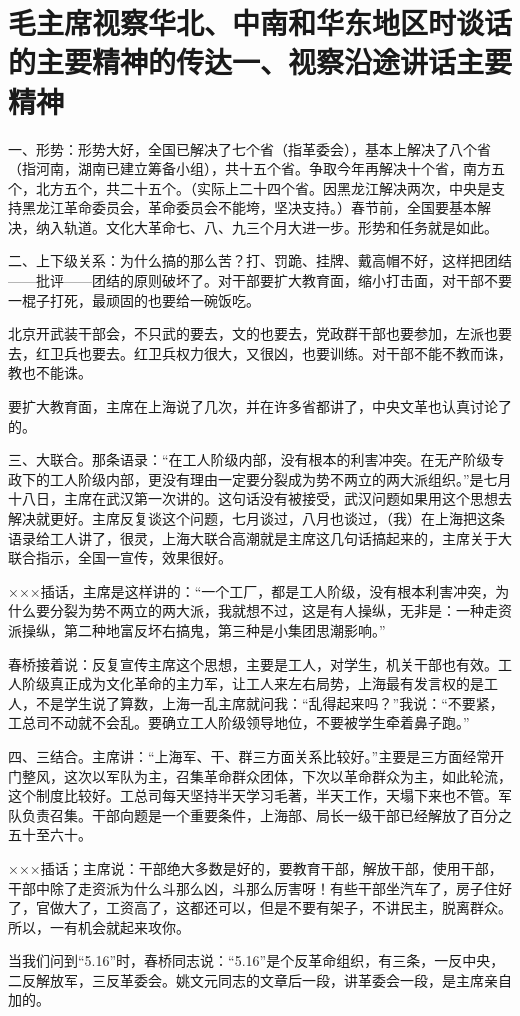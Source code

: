 \section[毛主席视察华北、中南和华东地区时谈话的主要精神的传达一、视察沿途讲话主要精神]{毛主席视察华北、中南和华东地区时谈话的主要精神的传达一、视察沿途讲话主要精神}


一、形势：形势大好，全国已解决了七个省（指革委会），基本上解决了八个省（指河南，湖南已建立筹备小组），共十五个省。争取今年再解决十个省，南方五个，北方五个，共二十五个。（实际上二十四个省。因黑龙江解决两次，中央是支持黑龙江革命委员会，革命委员会不能垮，坚决支持。）春节前，全国要基本解决，纳入轨道。文化大革命七、八、九三个月大进一步。形势和任务就是如此。

二、上下级关系：为什么搞的那么苦？打、罚跪、挂牌、戴高帽不好，这样把团结——批评——团结的原则破坏了。对干部要扩大教育面，缩小打击面，对干部不要一棍子打死，最顽固的也要给一碗饭吃。

北京开武装干部会，不只武的要去，文的也要去，党政群干部也要参加，左派也要去，红卫兵也要去。红卫兵权力很大，又很凶，也要训练。对干部不能不教而诛，教也不能诛。

要扩大教育面，主席在上海说了几次，并在许多省都讲了，中央文革也认真讨论了的。

三、大联合。那条语录：“在工人阶级内部，没有根本的利害冲突。在无产阶级专政下的工人阶级内部，更没有理由一定要分裂成为势不两立的两大派组织。”是七月十八日，主席在武汉第一次讲的。这句话没有被接受，武汉问题如果用这个思想去解决就更好。主席反复谈这个问题，七月谈过，八月也谈过，（我）在上海把这条语录给工人讲了，很灵，上海大联合高潮就是主席这几句话搞起来的，主席关于大联合指示，全国一宣传，效果很好。

×××插话，主席是这样讲的：“一个工厂，都是工人阶级，没有根本利害冲突，为什么要分裂为势不两立的两大派，我就想不过，这是有人操纵，无非是：一种走资派操纵，第二种地富反坏右搞鬼，第三种是小集团思潮影响。”

春桥接着说：反复宣传主席这个思想，主要是工人，对学生，机关干部也有效。工人阶级真正成为文化革命的主力军，让工人来左右局势，上海最有发言权的是工人，不是学生说了算数，上海一乱主席就问我：“乱得起来吗？”我说：“不要紧，工总司不动就不会乱。要确立工人阶级领导地位，不要被学生牵着鼻子跑。”

四、三结合。主席讲：“上海军、干、群三方面关系比较好。”主要是三方面经常开门整风，这次以军队为主，召集革命群众团体，下次以革命群众为主，如此轮流，这个制度比较好。工总司每天坚持半天学习毛著，半天工作，天塌下来也不管。军队负责召集。干部向题是一个重要条件，上海部、局长一级干部已经解放了百分之五十至六十。

×××插话；主席说：干部绝大多数是好的，要教育干部，解放干部，使用干部，干部中除了走资派为什么斗那么凶，斗那么厉害呀！有些干部坐汽车了，房子住好了，官做大了，工资高了，这都还可以，但是不要有架子，不讲民主，脱离群众。所以，一有机会就起来攻你。

当我们问到“5.16”时，春桥同志说：“5.16”是个反革命组织，有三条，一反中央，二反解放军，三反革委会。姚文元同志的文章后一段，讲革委会一段，是主席亲自加的。


